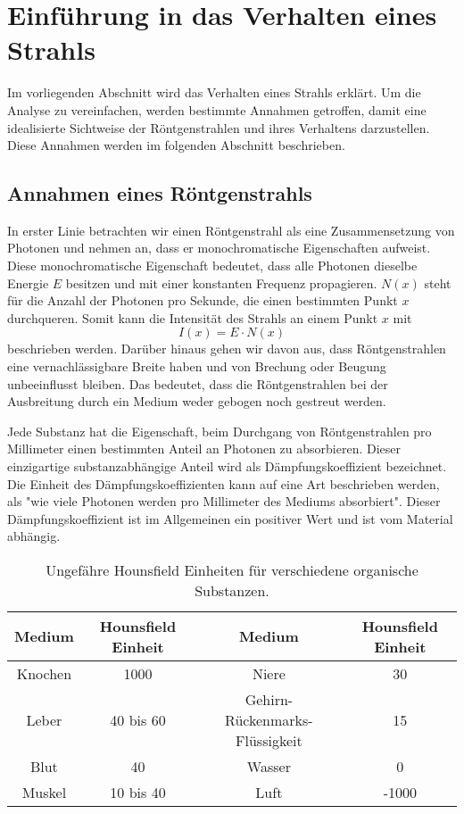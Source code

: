 %
%
%
%
\section{Einführung in das Verhalten eines Strahls
	\label{ct:section:EinführungEinesStrahls}}

Im vorliegenden Abschnitt wird das Verhalten eines Strahls erklärt. Um die Analyse zu vereinfachen, werden bestimmte Annahmen getroffen, damit eine idealisierte Sichtweise der Röntgenstrahlen und ihres Verhaltens darzustellen. Diese Annahmen werden im folgenden Abschnitt beschrieben.

\subsection{Annahmen eines Röntgenstrahls
	\label{ct:subsection:annahmen}}
In erster Linie betrachten wir einen Röntgenstrahl als eine Zusammensetzung von Photonen und nehmen an, dass er monochromatische Eigenschaften aufweist. Diese monochromatische Eigenschaft bedeutet, dass alle Photonen dieselbe Energie $E$ besitzen und mit einer konstanten Frequenz propagieren. $N(x)$ steht für die Anzahl der Photonen pro Sekunde, die einen bestimmten Punkt $x$ durchqueren. Somit kann die Intensität des Strahls an einem Punkt $x$ mit
\begin{equation}
	I(x) = E\cdot N(x)
\end{equation}
beschrieben werden. Darüber hinaus gehen wir davon aus, dass Röntgenstrahlen eine vernachlässigbare Breite haben und von Brechung oder Beugung unbeeinflusst bleiben. Das bedeutet, dass die Röntgenstrahlen bei der Ausbreitung durch ein Medium weder gebogen noch gestreut werden.

Jede Substanz hat die Eigenschaft, beim Durchgang von Röntgenstrahlen pro Millimeter einen bestimmten Anteil an Photonen zu absorbieren. Dieser einzigartige substanzabhängige Anteil wird als Dämpfungskoeffizient bezeichnet. Die Einheit des Dämpfungskoeffizienten kann auf eine Art beschrieben werden, als "wie viele Photonen werden pro Millimeter des Mediums absorbiert". Dieser Dämpfungskoeffizient ist im Allgemeinen ein positiver Wert und ist vom Material abhängig.  
\begin{table}
	\centering
	\begin{tabular}{|>{}c<{}|>{}c<{}| >{}c<{}| >{}c<{}|}
		\hline
		Medium &  Hounsfield Einheit & Medium &  Hounsfield Einheit\\
		\hline
		Knochen & 1000		& Niere & 30\\
		Leber 	& 40 bis 60	& Gehirn-Rückenmarks-Flüssigkeit & 15\\
		Blut 	& 40		& Wasser & 0\\
		Muskel 	& 10 bis 40 & Luft & -1000\\
		\hline
	\end{tabular}
	\caption{Ungefähre Hounsfield Einheiten für verschiedene organische Substanzen.
		\label{ct:hounsfieldunits}}
\end{table}

